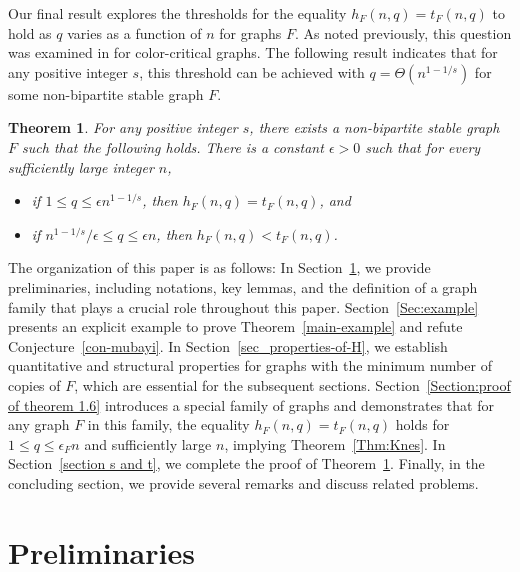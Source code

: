 \documentclass[10pt]{article}
\newtheorem{theorem}{Theorem}[section]
\begin{document}
Our final result explores the thresholds for the equality $h_F(n,q)=t_F(n,q)$ to hold as $q$ varies as a function of $n$ for graphs $F$.
As noted previously, this question was examined in \cite{pikhurko2017} for color-critical graphs.
The following result indicates that for any positive integer $s$, this threshold can be achieved with $q=\Theta(n^{1-1/s})$ for some non-bipartite stable graph $F$.

\begin{theorem}\label{Thm:hVSt}
For any positive integer $s$,
there exists a non-bipartite stable graph $F$ such that the following holds.
There is a constant $\epsilon>0$ such that for every sufficiently large integer $n$,
\begin{itemize}
\item[(1)] if $1\leq q \le \epsilon n^{1-1/s}$, then $h_F(n,q)=t_F(n,q)$, and
\item[(2)] if $n^{1-1/s}/\epsilon \le q\le \epsilon n$, then $h_F(n,q)<t_F(n,q)$.
\end{itemize}
\end{theorem}

The organization of this paper is as follows:
In Section~\ref{Sec:pre}, we provide preliminaries, including notations, key lemmas, and the definition of a graph family that plays a crucial role throughout this paper.
Section~\ref{Sec:example} presents an explicit example to prove Theorem~\ref{main-example} and refute Conjecture~\ref{con-mubayi}.
In Section~\ref{sec_properties-of-H}, we establish quantitative and structural properties for graphs with the minimum number of copies of $F$, which are essential for the subsequent sections.
Section~\ref{Section:proof of theorem 1.6} introduces a special family of graphs and demonstrates that for any graph $F$ in this family, the equality $h_F(n,q)=t_F(n,q)$ holds for $1\leq q\leq \epsilon_F n$ and sufficiently large $n$, implying Theorem~\ref{Thm:Knes}.
In Section~\ref{section s and t}, we complete the proof of Theorem~\ref{Thm:hVSt}.
Finally, in the concluding section, we provide several remarks and discuss related problems.



\section{Preliminaries}\label{Sec:pre}
\end{document}

